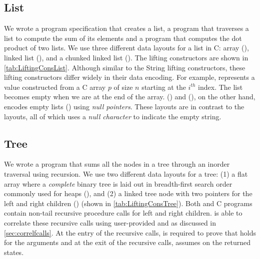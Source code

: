 

\subsection{List}
\label{sec:explist}
We wrote a \SpecL{} program specification that creates a list, a
program that traverses a list to compute the sum of its elements and a program
that computes the dot product of two lists. We use three different
data layouts for a list in C: array (),
linked list (), and
a chunked linked list ().
The lifting constructors are shown in \cref{tab:LiftingConsList}.
Although similar to the String lifting constructors, these lifting
constructors differ widely in their data encoding. For example,
 represents a  value constructed
from a C array $p$ of size $n$ starting at the $i^{th}$ index. The list becomes empty
when we are at the end of the array. ()
and (), on the other hand, encodes empty
lists () using {\em null pointers}. These layouts are in contrast to the
 layouts, all of which uses a {\em null character} to
indicate the empty string.



\subsection{Tree}
\label{sec:exptree}
We wrote a \SpecL{} program that sums all the nodes in a tree
through an inorder traversal using recursion. We use two different data layouts for a tree: 
(1) a flat array where a
{\em complete} binary tree is laid out in breadth-first search order commonly used for heaps (),
and (2) a linked tree node with two pointers for the left and right children () (shown in \cref{tab:LiftingConsTree}).
Both \SpecL{} and C programs contain non-tail recursive procedure calls for left and right children.
\toolName{} is able to correlate these recursive calls using user-provided \pre{} and \post{} as discussed in \cref{sec:correlfcalls}.
At the entry of the recursive calls, \toolName{} is required to prove that \pre{} holds for the arguments
and at the exit of the recursive calls, \toolName{} assumes \post{} on the returned states.

